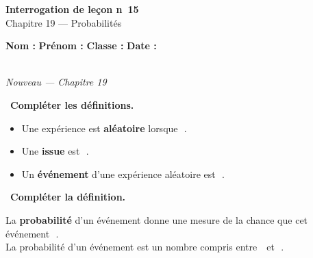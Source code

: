 \documentclass[a4paper,11pt]{article}
\newcommand{\bl}[1][4cm]{\,\makebox[#1]{\dotfill}\,}
\newcommand{\coeur}{\textcolor{Couleur8}{\faHeart}\ }
\begin{document}
\begin{mdframed}[linecolor=Couleur1,linewidth=2pt,topline=true,bottomline=true,leftline=false,rightline=false,innertopmargin=8pt,innerbottommargin=8pt,backgroundcolor=Couleur1!5]
\begin{center}
{\Large\bfseries\textcolor{Couleur1}{Interrogation de le\c{c}on n\degre~15}}\\[4pt]
{\large\textcolor{Couleur8}{Chapitre 19 --- Probabilit\'es}}
\end{center}
\end{mdframed}
\vspace{0.4cm}
\noindent\textbf{Nom :} \dotfill\quad\textbf{Pr\'enom :} \dotfill\quad\textbf{Classe :} \dotfill\quad\textbf{Date :} \dotfill
\vspace{0.5cm}

\vspace{0.3cm}
\noindent{\textcolor{Couleur8}{\rule{\textwidth}{0.5pt}}}\\
{\small\textit{\textcolor{Couleur8}{Nouveau --- Chapitre 19}}}
\vspace{0.1cm}

\noindent \coeur \textbf{Compl\'eter les d\'efinitions.}
\begin{mdframed}[linecolor=Couleur6,linewidth=4pt,topline=false,bottomline=false,rightline=false,backgroundcolor=Couleur6!10,innerleftmargin=8pt,innertopmargin=6pt,innerbottommargin=6pt]
\begin{itemize}[label=\textcolor{Couleur6}{$\bullet$},nosep,itemsep=4pt]
\item Une exp\'erience est \textbf{al\'eatoire} lorsque \bl[7cm].
\item Une \textbf{issue} est \bl[7cm].
\item Un \textbf{\'ev\'enement} d'une exp\'erience al\'eatoire est \bl[6cm].
\end{itemize}
\end{mdframed}

\noindent \coeur \textbf{Compl\'eter la d\'efinition.}
\begin{mdframed}[linecolor=Couleur6,linewidth=4pt,topline=false,bottomline=false,rightline=false,backgroundcolor=Couleur6!10,innerleftmargin=8pt,innertopmargin=6pt,innerbottommargin=6pt]
La \textbf{probabilit\'e} d'un \'ev\'enement donne une mesure de la chance que cet \'ev\'enement \bl[4cm].\\[4pt]
La probabilit\'e d'un \'ev\'enement est un nombre compris entre \bl[2cm] et \bl[2cm].
\end{mdframed}
\end{document}

